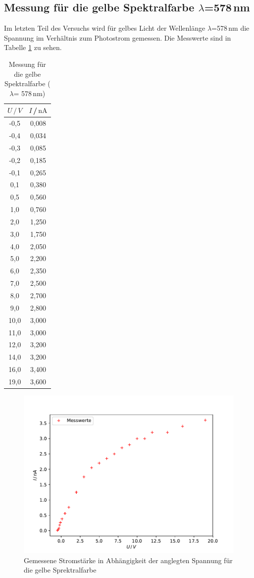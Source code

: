 \subsection{Messung für die gelbe Spektralfarbe $\lambda$=578\,nm}
Im letzten Teil des Versuchs wird für gelbes Licht der Wellenlänge $\lambda$=578\,nm
die Spannung im Verhältnis zum Photostrom gemessen. Die Messwerte sind in Tabelle \ref{tab:Messungb}
zu sehen.
\begin{table}
  \centering
  \caption{Messung für die gelbe Spektralfarbe ($\lambda$= 578\,nm)}
  \label{tab:Messungb}
  \begin{tabular}{c c}
    \toprule {$U\,/\,V$} & {$I$\,/\,$\si{\nano\ampere}$}\\
    \midrule
-0,5 & 0,008 \\
-0,4 & 0,034 \\
-0,3 & 0,085 \\
-0,2 & 0,185 \\
-0,1 & 0,265 \\
0,1 & 0,380 \\
0,5 & 0,560 \\
1,0 & 0,760 \\
2,0 & 1,250 \\
3,0 & 1,750 \\
4,0 & 2,050 \\
5,0 & 2,200 \\
6,0 & 2,350 \\
7,0 & 2,500 \\
8,0 & 2,700 \\
9,0 & 2,800 \\
10,0 & 3,000 \\
11,0 & 3,000 \\
12,0 & 3,200 \\
14,0 & 3,200 \\
16,0 & 3,400 \\
19,0 & 3,600 \\
\bottomrule
\end{tabular}
\end{table}
\begin{figure}
  \centering
  \includegraphics[scale=0.6]{gelb.pdf}
  \caption{Gemessene Stromstärke in Abhängigkeit der anglegten Spannung für die gelbe Sprektralfarbe}
  \label{fig:gelb}
\end{figure}
